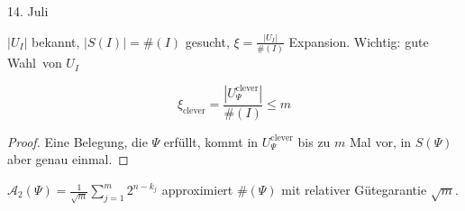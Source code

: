 \hfill 14. Juli
\vspace{0.5cm}


$|U_I|$ bekannt, $|S(I)| = \#(I)$ gesucht, $\xi = \frac{|U_I|}{\#(I)}$
Expansion. Wichtig: \glqq gute Wahl\grqq\ von $U_I$

\begin{lemm}[Expansionslemma]
	\[
	  \xi_{\text{clever}} =
	  \frac{\left|U_{\Psi}^{\text{clever}}\right|}{\#(I)} \leq m
	\]
\end{lemm}
\begin{proof}
	Eine Belegung, die $\Psi$ erfüllt, kommt in $U_{\Psi}^{\text{clever}}$
	bis zu $m$ Mal vor, in $S(\Psi)$ aber genau einmal.
\end{proof}

$\mathcal{A}_2(\Psi) = \frac{1}{\sqrt{m}} \sum_{j=1}^m 2^{n-k_j}$ approximiert
$\#(\Psi)$ mit relativer Gütegarantie $\sqrt{m}$.
